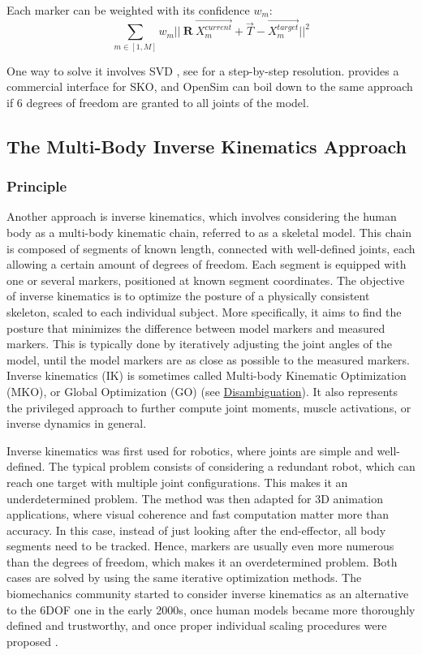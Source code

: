 Each marker can be weighted with its confidence $w_m$:
\begin{equation}\label{eq:weighted_sko}
  \sum_{m \in [1,M]}
  w_m ||\ \textbf{R} \ \overrightarrow{X^{current}_m} + \overrightarrow{T} - \overrightarrow{X^{target}_m} ||^2
\end{equation} 

One way to solve it involves SVD \cite{Arun1987,Soderkvist1993} %
, see \cite{Sorkine2017} for a step-by-step resolution. \cite{Visual3D} provides a commercial interface for SKO, and OpenSim can boil down to the same approach if 6 degrees of freedom are granted to all joints of the model.


\newpage
\subsection{The Multi-Body Inverse Kinematics Approach}\label{invkin}

\subsubsection{Principle}

Another approach is inverse kinematics, which involves considering the human body as a multi-body kinematic chain, referred to as a skeletal model. This chain is composed of segments of known length, connected with well-defined joints, each allowing a certain amount of degrees of freedom. Each segment is equipped with one or several markers, positioned at known segment coordinates. The objective of inverse kinematics is to optimize the posture of a physically consistent skeleton, scaled to each individual subject. More specifically, it aims to find the posture that minimizes the difference between model markers and measured markers. This is typically done by iteratively adjusting the joint angles of the model, until the model markers are as close as possible to the measured markers. Inverse kinematics (IK) is sometimes called Multi-body Kinematic Optimization (MKO), or Global Optimization (GO) \cite{Begon2018} (see \hyperlink{Ann:gloss}{Disambiguation}). It also represents the privileged approach to further compute joint moments, muscle activations, or inverse dynamics in general.

Inverse kinematics was first used for robotics, where joints are simple and well-defined. The typical problem consists of considering a redundant robot, which can reach one target with multiple joint configurations. This makes it an underdetermined problem. The method was then adapted for 3D animation applications, where visual coherence and fast computation matter more than accuracy. In this case, instead of just looking after the end-effector, all body segments need to be tracked. Hence, markers are usually even more numerous than the degrees of freedom, which makes it an overdetermined problem. Both cases are solved by using the same iterative optimization methods. The biomechanics community started to consider inverse kinematics as an alternative to the 6DOF one in the early 2000s, once human models became more thoroughly defined and trustworthy, and once proper individual scaling procedures were proposed \cite{Hicks2015}.

